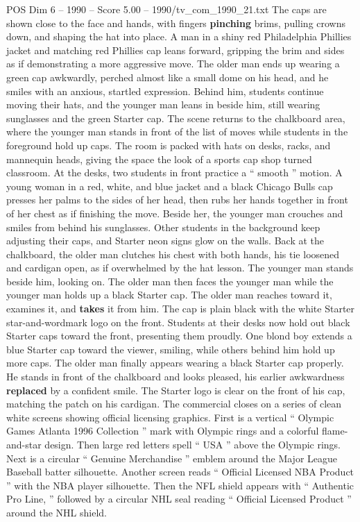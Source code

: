\begin{textsample}{POS Dim 6 – 1990 – Score 5.00 – 1990/tv\_com\_1990\_21.txt}
The caps are shown close to the face and hands, with fingers \textbf{pinching} brims, pulling crowns down, and shaping the hat into place.
A man in a shiny red Philadelphia Phillies jacket and matching red Phillies cap leans forward, gripping the brim and sides as if demonstrating a more aggressive move.
The older man ends up wearing a green cap awkwardly, perched almost like a small dome on his head, and he smiles with an anxious, startled expression.
Behind him, students continue moving their hats, and the younger man leans in beside him, still wearing sunglasses and the green Starter cap.
The scene returns to the chalkboard area, where the younger man stands in front of the list of moves while students in the foreground hold up caps.
The room is packed with hats on desks, racks, and mannequin heads, giving the space the look of a sports cap shop turned classroom.
At the desks, two students in front practice a “ smooth ” motion.
A young woman in a red, white, and blue jacket and a black Chicago Bulls cap presses her palms to the sides of her head, then rubs her hands together in front of her chest as if finishing the move.
Beside her, the younger man crouches and smiles from behind his sunglasses.
Other students in the background keep adjusting their caps, and Starter neon signs glow on the walls.
Back at the chalkboard, the older man clutches his chest with both hands, his tie loosened and cardigan open, as if overwhelmed by the hat lesson.
The younger man stands beside him, looking on.
The older man then faces the younger man while the younger man holds up a black Starter cap.
The older man reaches toward it, examines it, and \textbf{takes} it from him.
The cap is plain black with the white Starter star-and-wordmark logo on the front.
Students at their desks now hold out black Starter caps toward the front, presenting them proudly.
One blond boy extends a blue Starter cap toward the viewer, smiling, while others behind him hold up more caps.
The older man finally appears wearing a black Starter cap properly.
He stands in front of the chalkboard and looks pleased, his earlier awkwardness \textbf{replaced} by a confident smile.
The Starter logo is clear on the front of his cap, matching the patch on his cardigan.
The commercial closes on a series of clean white screens showing official licensing graphics.
First is a vertical “ Olympic Games Atlanta 1996 Collection ” mark with Olympic rings and a colorful flame-and-star design.
Then large red letters spell “ USA ” above the Olympic rings.
Next is a circular “ Genuine Merchandise ” emblem around the Major League Baseball batter silhouette.
Another screen reads “ Official Licensed NBA Product ” with the NBA player silhouette.
Then the NFL shield appears with “ Authentic Pro Line, ” followed by a circular NHL seal reading “ Official Licensed Product ” around the NHL shield.

\end{textsample}
